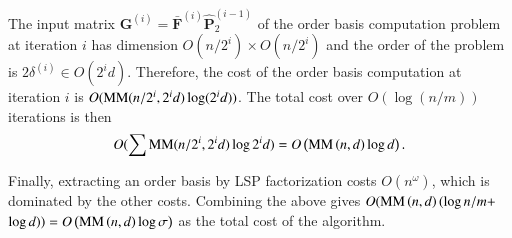 \begin{pf}
The input matrix $\mathbf{G}^{\left(i\right)}=\bar{\mathbf{F}}^{\left(i\right)}\hat{\mathbf{P}}_{2}^{\left(i-1\right)}$
of the order basis computation problem at iteration $i$ has dimension
$O(n/2^{i})\times O(n/2^{i})$ and the order of the problem is $2\delta^{\left(i\right)}\in O(2^{i}d)$.
Therefore, the cost of the order basis computation at iteration $i$
is $O(\MM(n/2^{i},2^{i}d)\log(2^{i}d))$. The total cost over $O(\log\left(n/m\right))$
iterations is then \[
O(\sum\MM(n/2^{i},2^{i}d)\log2^{i}d)=O\left(\MM\left(n,d\right)\log d\right).\]
%
\begin{comment}
not sure if this needs more explanation. 
\end{comment}
{}

Finally, extracting an order basis by LSP factorization costs $O\left(n^{\omega}\right)$,
which is dominated by the other costs. Combining the above gives $O(\MM\left(n,d\right)(\log n/m+$$\log d))=O\left(\MM\left(n,d\right)\log\sigma\right)$
as the total cost of the algorithm. 
\end{pf}


